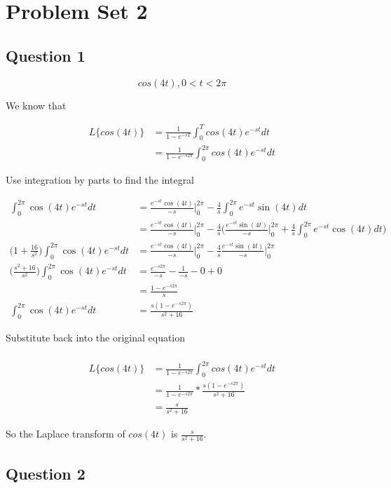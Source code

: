 \documentclass[titlepage]{article}
\begin{document}
\section{Problem Set 2}
\subsection{Question 1}
$$cos(4t), 0 < t < 2\pi$$

\noindent We know that

\begin{align*}
  L\{cos(4t)\} &= \frac{1}{1 - e^{-sT}} \int_0^T cos(4t)e^{-st} dt
  \\&= \frac{1}{1 - e^{-s2\pi}} \int_0^{2\pi} cos(4t)e^{-st} dt
\end{align*}

\noindent Use integration by parts to find the integral

\begin{align*}
  \int_0^{2\pi} \cos(4t)e^{-st} dt &= \frac{e^{-st}\cos(4t)}{-s}\Big|_0^{2\pi} - \frac{4}{s} \int_0^{2\pi} e^{-st}\sin(4t) dt
  \\&= \frac{e^{-st}\cos(4t)}{-s}\Big|_0^{2\pi} - \frac{4}{s} \bigg(\frac{e^{-st}\sin(4t)}{-s}\Big|_0^{2\pi} + \frac{4}{s}\int_0^{2\pi}e^{-st}\cos(4t) dt\bigg)
  \\\bigg(1 + \frac{16}{s^2}\bigg)\int_0^{2\pi} \cos(4t)e^{-st} dt &= \frac{e^{-st}\cos(4t)}{-s}\Big|_0^{2\pi} - \frac{4}{s}\frac{e^{-st}\sin(4t)}{-s}\Big|_0^{2\pi}
  \\\bigg(\frac{s^2 + 16}{s^2}\bigg)\int_0^{2\pi} \cos(4t)e^{-st} dt &= \frac{e^{-s2\pi}}{-s} - \frac{1}{-s} - 0 + 0
  \\&= \frac{1 - e^{-s2\pi}}{s}
  \\\int_0^{2\pi} \cos(4t)e^{-st} dt &= \frac{s(1 - e^{-s2\pi})}{s^2 + 16}
\end{align*}

\noindent Substitute back into the original equation

\begin{align*}
  \\L\{cos(4t)\} &= \frac{1}{1 - e^{-s2\pi}} \int_0^{2\pi} cos(4t)e^{-st} dt
  \\&= \frac{1}{1 - e^{-s2\pi}} * \frac{s(1 - e^{-s2\pi})}{s^2 + 16}
  \\&= \frac{s}{s^2 + 16}
\end{align*}

So the Laplace transform of $cos(4t)$ is $\frac{s}{s^2 + 16}$.

\subsection{Question 2}
\end{document}
